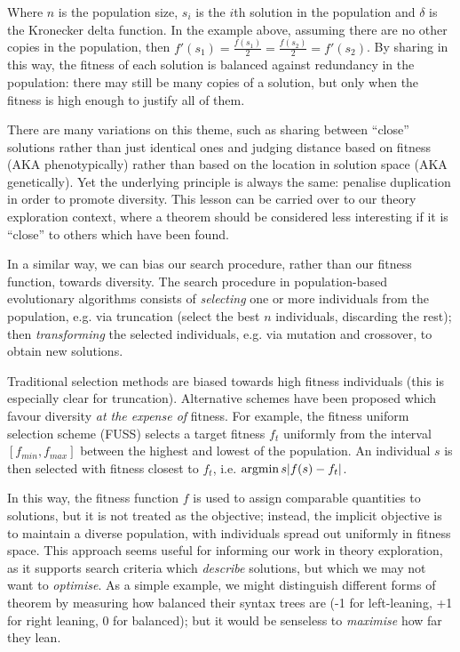 \documentclass[]{article}
\begin{document}
Where $n$ is the population size, $s_i$ is the $i$th solution in the population and $\delta$ is the Kronecker delta function. In the example above, assuming there are no other copies in the population, then $f'(s_1) = \frac{f(s_1)}{2} = \frac{f(s_2)}{2} = f'(s_2)$. By sharing in this way, the fitness of each solution is balanced against redundancy in the population: there may still be many copies of a solution, but only when the fitness is high enough to justify all of them.

There are many variations on this theme, such as sharing between ``close'' solutions rather than just identical ones and judging distance based on fitness (AKA phenotypically) rather than based on the location in solution space (AKA genetically). Yet the underlying principle is always the same: penalise duplication in order to promote diversity. This lesson can be carried over to our theory exploration context, where a theorem should be considered less interesting if it is ``close'' to others which have been found.

In a similar way, we can bias our search procedure, rather than our fitness function, towards diversity. The search procedure in population-based evolutionary algorithms consists of \emph{selecting} one or more individuals from the population, e.g. via truncation (select the best $n$ individuals, discarding the rest); then \emph{transforming} the selected individuals, e.g. via mutation and crossover, to obtain new solutions.

\newcommand{\argmin}{\operatornamewithlimits{argmin}}

Traditional selection methods are biased towards high fitness individuals (this is especially clear for truncation). Alternative schemes have been proposed which favour diversity \emph{at the expense of} fitness. For example, the fitness uniform selection scheme (FUSS) \cite{hutter2002fitness} selects a target fitness $f_t$ uniformly from the interval $\left[ f_{min}, f_{max} \right]$ between the highest and lowest of the population. An individual $s$ is then selected with fitness closest to $f_t$, i.e. $\argmin{s}{\lvert f(s) - f_t \rvert}$.

In this way, the fitness function $f$ is used to assign comparable quantities to solutions, but it is not treated as the objective; instead, the implicit objective is to maintain a diverse population, with individuals spread out uniformly in fitness space. This approach seems useful for informing our work in theory exploration, as it supports search criteria which \emph{describe} solutions, but which we may not want to \emph{optimise}. As a simple example, we might distinguish different forms of theorem by measuring how balanced their syntax trees are (-1 for left-leaning, +1 for right leaning, 0 for balanced); but it would be senseless to \emph{maximise} how far they lean.
\end{document}
